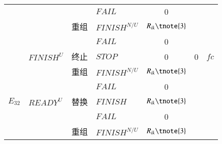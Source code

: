 \begin{table}[htbp]
\begin{threeparttable}
\begin{tabular}{clclccc}
            {}
            & {}
            & {} 
            & {$FAIL$} 
            & {0}
            & {} 
            & {} \\
            
            {}
            & {}
            & {重组} 
            & {$FINISH^{N/U}$} 
            & $R_{ik}\tnote{3}$ 
            & {\multirow{2}{*}{$T_{i0}+\sum\limits_{x = i}^j {({T_{xk}} - {T_{x0}})} $}}
            & {\multirow{2}{*}{$C_{i0}+\sum\limits_{x = i}^j {({C_{xk}} - {C_{x0}})} $}} \\
            
            
            {}
            & {}
            & {} 
            & {$FAIL$} 
            & {0}
            & {} 
            & {} \\
            
            {} 
            & {${FINISH^U}$}
            & {终止}
            & {$STOP$} 
            & {0} 
            & {0} 
            & {$fc$} \\
            
            {}
            & {}
            & {重组} 
            & {$FINISH^{N/U}$} 
            & $R_{ik}\tnote{3}$ 
            & {\multirow{2}{*}{$\sum\limits_{x = i}^j {({T_{xk}} - {T_{x0}})} $}}
            & {\multirow{2}{*}{$\sum\limits_{x = i}^j {({C_{xk}} - {C_{x0}})} $}} \\
            
            
            {}
            & {}
            & {} 
            & {$FAIL$} 
            & {0}
            & {} 
            & {} \\
            {$E_{32}$} 
            & {$READY^U$}
            & {替换} 
            & {$FINISH$} 
            & $R_{ik}\tnote{3}$ 
            & {\multirow{2}{*}{$T_{ik}-T_{i0}$}} 
            & {\multirow{2}{*}{$C_{ik}-C_{i0}$}} \\
            
            {}
            & {}
            & {} 
            & {$FAIL$} 
            & {0}
            & {} 
            & {} \\
            
            {}
            & {}
            & {重组} 
            & {$FINISH^{N/U}$} 
            & $R_{ik}\tnote{3}$ 
            & {\multirow{2}{*}{$\sum\limits_{x = i}^j {({T_{xk}} - {T_{x0}})} $}}
            & {\multirow{2}{*}{$\sum\limits_{x = i}^j {({C_{xk}} - {C_{x0}})} $}} \\
            

\end{tabular}
\end{threeparttable}
\end{table}
